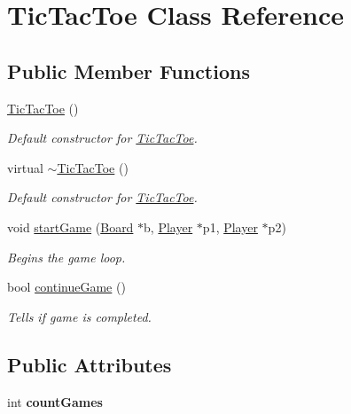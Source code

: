\hypertarget{classTicTacToe}{}\section{Tic\+Tac\+Toe Class Reference}
\label{classTicTacToe}
\subsection*{Public Member Functions}
\begin{DoxyCompactItemize}
\item 
\mbox{\hyperlink{classTicTacToe_a103fe9a5ae41b5ef756e20594a70cb7a}{Tic\+Tac\+Toe}} ()
\begin{DoxyCompactList}\small\item\em Default constructor for \mbox{\hyperlink{classTicTacToe}{Tic\+Tac\+Toe}}. \end{DoxyCompactList}\item 
virtual \mbox{\hyperlink{classTicTacToe_a5e9c4ed3279034d5530cc7b94a3e10e5}{$\sim$\+Tic\+Tac\+Toe}} ()
\begin{DoxyCompactList}\small\item\em Default constructor for \mbox{\hyperlink{classTicTacToe}{Tic\+Tac\+Toe}}. \end{DoxyCompactList}\item 
void \mbox{\hyperlink{classTicTacToe_afe9570245c1c941777a7bd367ee10e61}{start\+Game}} (\mbox{\hyperlink{classBoard}{Board}} $\ast$b, \mbox{\hyperlink{classPlayer}{Player}} $\ast$p1, \mbox{\hyperlink{classPlayer}{Player}} $\ast$p2)
\begin{DoxyCompactList}\small\item\em Begins the game loop. \end{DoxyCompactList}\item 
bool \mbox{\hyperlink{classTicTacToe_a866e38e3280ef65ae6f43473cc4e0532}{continue\+Game}} ()
\begin{DoxyCompactList}\small\item\em Tells if game is completed. \end{DoxyCompactList}\end{DoxyCompactItemize}
\subsection*{Public Attributes}
\begin{DoxyCompactItemize}
\item 
\mbox{\label{classTicTacToe_a821713e03bf267232724ecdb5e5d3f3f}} 
int {\bfseries count\+Games}
\end{DoxyCompactItemize}


